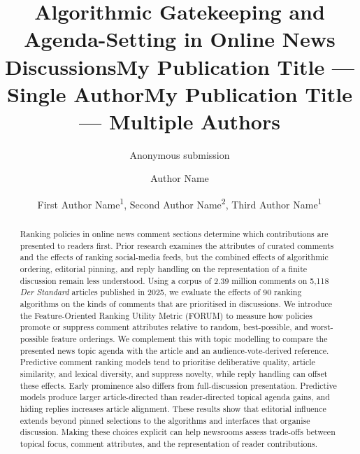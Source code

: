 \documentclass[letterpaper]{article} %
\title{Algorithmic Gatekeeping and Agenda-Setting in Online News Discussions}
\author{Anonymous submission
}
\title{My Publication Title --- Single Author}
\author {
    Author Name
}
\title{My Publication Title --- Multiple Authors}
\author {
    First Author Name\textsuperscript{\rm 1},
    Second Author Name\textsuperscript{\rm 2},
    Third Author Name\textsuperscript{\rm 1}
}
\begin{document}
\maketitle

\begin{abstract}
Ranking policies in online news comment sections determine which contributions are presented to readers first. Prior research examines the attributes of curated comments and the effects of ranking social-media feeds, but the combined effects of algorithmic ordering, editorial pinning, and reply handling on the representation of a finite discussion remain less understood. Using a corpus of 2.39 million comments on 5,118 \textit{Der Standard} articles published in 2025, we evaluate the effects of 90 ranking algorithms on the kinds of comments that are prioritised in discussions. We introduce the Feature-Oriented Ranking Utility Metric (FORUM) to measure how policies promote or suppress comment attributes relative to random, best-possible, and worst-possible feature orderings. We complement this with topic modelling to compare the presented news topic agenda with the article and an audience-vote-derived reference. Predictive comment ranking models tend to prioritise deliberative quality, article similarity, and lexical diversity, and suppress novelty, while reply handling can offset these effects. Early prominence also differs from full-discussion presentation. Predictive models produce larger article-directed than reader-directed topical agenda gains, and hiding replies increases article alignment. These results show that editorial influence extends beyond pinned selections to the algorithms and interfaces that organise discussion. Making these choices explicit can help newsrooms assess trade-offs between topical focus, comment attributes, and the representation of reader contributions. 
\end{abstract}

\begin{links}
\end{links}



\clearpage

\clearpage
\appendix

\end{document}
